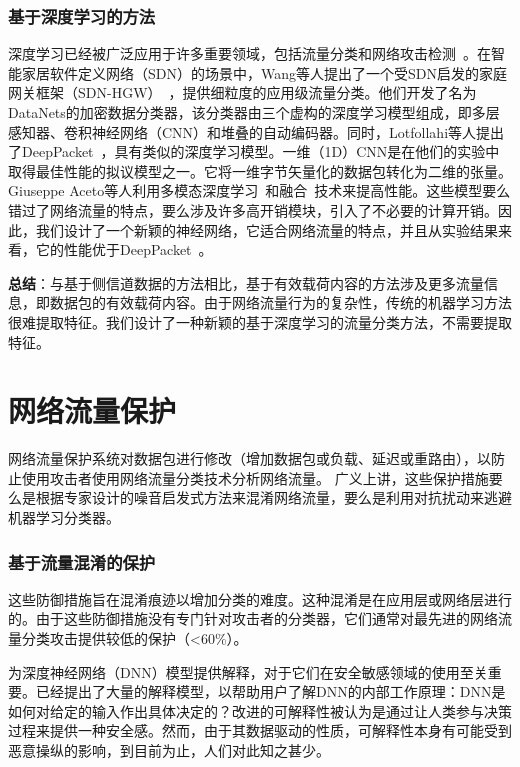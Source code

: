 \documentclass[degree=master,cjk-font=noto]{thuthesis}
\begin{document}
\subsubsection{基于深度学习的方法}

深度学习已经被广泛应用于许多重要领域，包括流量分类和网络攻击检测~\cite{iot_attack_detection}。在智能家居软件定义网络（SDN）的场景中，Wang等人提出了一个受SDN启发的家庭网关框架（SDN-HGW）~\cite{SDN_HGW}，提供细粒度的应用级流量分类。他们开发了名为DataNets的加密数据分类器，该分类器由三个虚构的深度学习模型组成，即多层感知器、卷积神经网络（CNN）和堆叠的自动编码器。同时，Lotfollahi等人提出了DeepPacket~\cite{deep_packet}，具有类似的深度学习模型。一维（1D）CNN是在他们的实验中取得最佳性能的拟议模型之一。它将一维字节矢量化的数据包转化为二维的张量。Giuseppe Aceto等人利用多模态深度学习~\cite{MIMETIC}和融合~\cite{mobile_app_class}技术来提高性能。这些模型要么错过了网络流量的特点，要么涉及许多高开销模块，引入了不必要的计算开销。因此，我们设计了一个新颖的神经网络，它适合网络流量的特点，并且从实验结果来看，它的性能优于DeepPacket~\cite{deep_packet}。

\textbf{总结}：与基于侧信道数据的方法相比，基于有效载荷内容的方法涉及更多流量信息，即数据包的有效载荷内容。由于网络流量行为的复杂性，传统的机器学习方法很难提取特征。我们设计了一种新颖的基于深度学习的流量分类方法，不需要提取特征。

\section{网络流量保护}

网络流量保护系统对数据包进行修改（增加数据包或负载、延迟或重路由），以防止使用攻击者使用网络流量分类技术分析网络流量。
广义上讲，这些保护措施要么是根据专家设计的噪音启发式方法来混淆网络流量，要么是利用对抗扰动来逃避机器学习分类器。

\subsubsection{基于流量混淆的保护}

这些防御措施旨在混淆痕迹以增加分类的难度。这种混淆是在应用层或网络层进行的。由于这些防御措施没有专门针对攻击者的分类器，它们通常对最先进的网络流量分类攻击提供较低的保护（<60\%）。

为深度神经网络（DNN）模型提供解释，对于它们在安全敏感领域的使用至关重要。已经提出了大量的解释模型，以帮助用户了解DNN的内部工作原理：DNN是如何对给定的输入作出具体决定的？改进的可解释性被认为是通过让人类参与决策过程来提供一种安全感。然而，由于其数据驱动的性质，可解释性本身有可能受到恶意操纵的影响，到目前为止，人们对此知之甚少。
\end{document}
